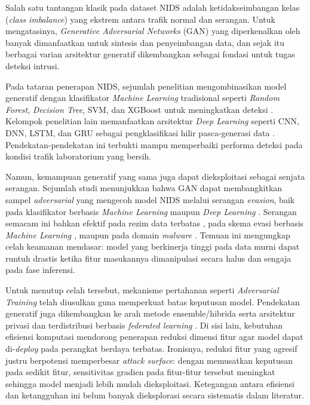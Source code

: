 \documentclass[10pt,twocolumn,a4paper]{extarticle}
\begin{document}
Salah satu tantangan klasik pada dataset NIDS adalah ketidakseimbangan kelas (\textit{class imbalance}) yang ekstrem antara trafik normal dan serangan. Untuk mengatasinya, \textit{Generative Adversarial Networks} (GAN) yang diperkenalkan oleh \citet{ref_gan} banyak dimanfaatkan untuk sintesis dan penyeimbangan data, dan sejak itu berbagai varian arsitektur generatif dikembangkan sebagai fondasi untuk tugas deteksi intrusi.

Pada tataran penerapan NIDS, sejumlah penelitian mengombinasikan model generatif dengan klasifikator \textit{Machine Learning} tradisional seperti \textit{Random Forest}, \textit{Decision Tree}, SVM, dan XGBoost untuk meningkatkan deteksi \citep{ref_mari,ref_kumar,ref_ctgan_ids,ref_mcgan,ref_syngan,ref_cegan}. Kelompok penelitian lain memanfaatkan arsitektur \textit{Deep Learning} seperti CNN, DNN, LSTM, dan GRU sebagai pengklasifikasi hilir pasca-generasi data \citep{ref_tcn,ref_speacgan,ref_tmggan,ref_park,ref_fewshot}. Pendekatan-pendekatan ini terbukti mampu memperbaiki performa deteksi pada kondisi trafik laboratorium yang bersih.

Namun, kemampuan generatif yang sama juga dapat dieksploitasi sebagai senjata serangan. Sejumlah studi menunjukkan bahwa GAN dapat membangkitkan sampel \textit{adversarial} yang mengecoh model NIDS melalui serangan \textit{evasion}, baik pada klasifikator berbasis \textit{Machine Learning} maupun \textit{Deep Learning} \citep{ref_sganids}. Serangan semacam ini bahkan efektif pada rezim data terbatas \citep{ref_evasiongan}, pada skema evasi berbasis \textit{Machine Learning} \citep{ref_demgan}, maupun pada domain \textit{malware} \citep{ref_aagan}. Temuan ini mengungkap celah keamanan mendasar: model yang berkinerja tinggi pada data murni dapat runtuh drastis ketika fitur masukannya dimanipulasi secara halus dan sengaja pada fase inferensi.

Untuk menutup celah tersebut, mekanisme pertahanan seperti \textit{Adversarial Training} telah diusulkan guna memperkuat batas keputusan model. Pendekatan generatif juga dikembangkan ke arah metode ensemble/hibrida \citep{ref_ewgan,ref_hybridwgan} serta arsitektur privasi dan terdistribusi berbasis \textit{federated learning} \citep{ref_nidsfgpa}. Di sisi lain, kebutuhan efisiensi komputasi mendorong penerapan reduksi dimensi fitur agar model dapat di-\textit{deploy} pada perangkat berdaya terbatas. Ironisnya, reduksi fitur yang agresif justru berpotensi memperbesar \textit{attack surface}: dengan memusatkan keputusan pada sedikit fitur, sensitivitas gradien pada fitur-fitur tersebut meningkat sehingga model menjadi lebih mudah dieksploitasi. Ketegangan antara efisiensi dan ketangguhan ini belum banyak dieksplorasi secara sistematis dalam literatur.
\end{document}
